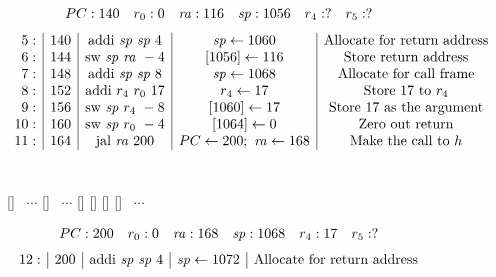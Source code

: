 \documentclass[acmsmall,review,anonymous]{acmart}\settopmatter{printfolios=true,printccs=false,printacmref=false}
\begin{document}
\begin{figure}
\begin{center}
\\
\end{center}
\[
\begin{array}{cccccc}
  PC: 140 & r_0 : 0 & \mathit{ra} : 116 & \mathit{sp} : 1056 & r_4 : ? & r_5 : ? 
\end{array}
\]
\vspace*{0.2em}
\[
  \begin{array}{r|c|c|c|c}
    5: & 140 & \text{addi} ~ \mathit{sp} ~ \mathit{sp} ~ 4 & \mathit{sp} \leftarrow 1060 & \text{Allocate for return address}\\
    6: & 144 & \text{sw} ~ \mathit{sp} ~ \mathit{ra} ~ -4 & [1056] \leftarrow 116 & \text{Store return address}\\
    7: & 148 & \text{addi} ~ \mathit{sp} ~ \mathit{sp} ~ 8 & \mathit{sp} \leftarrow 1068 & \text{Allocate for call frame}\\
    8: & 152 & \text{addi} ~ r_4 ~ r_0 ~ 17 & r_4 \leftarrow 17 & \text{Store 17 to $r_4$}\\
    9: & 156 & \text{sw} ~ \mathit{sp} ~ r_4 ~ -8 & [1060] \leftarrow 17 & \text{Store 17 as the argument}\\
    10: & 160 & \text{sw} ~ \mathit{sp} ~ r_0 ~ -4 & [1064] \leftarrow 0  & \text{Zero out return}\\
    11: & 164 & \text{jal} ~ \mathit{ra} ~ 200 & PC \leftarrow 200; ~ \mathit{ra} \leftarrow 168 & \text{Make the call to $h$}\\
  \end{array}
  \]
  ~ \\
\begin{center}
\MemoryLabel{49em}{1.8em}{$\downarrow$}
[{}]%
~$\cdots$
[{}]%
~$\cdots$
[{}]%
[{}]%
[{}]%
[{}]
~$\cdots$
\\
\end{center}
\[
\begin{array}{cccccc}
  PC: 200 & r_0 : 0 & \mathit{ra} : 168 & \mathit{sp} : 1068 & r_4 : 17 & r_5 : ? 
\end{array}
\]
\vspace*{0.2em}
\[
\begin{array}{r|c|c|c|c}
  12: & 200 & \text{addi} ~ \mathit{sp} ~ \mathit{sp} ~ 4 & \mathit{sp} \leftarrow 1072 & \text{Allocate for return address}\\

\end{array}\]
\end{figure}
\end{document}
